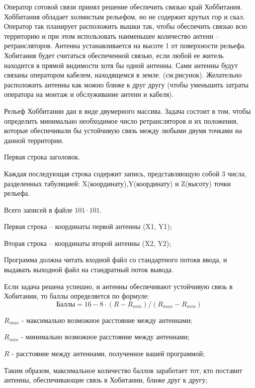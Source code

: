 
Оператор сотовой связи принял решение обеспечить связью край Хоббитания. Хоббитания обладает холмистым рельефом, но не содержит крутых гор и скал. Оператор так планирует расположить вышки так, чтобы обеспечить связью всю территорию и при этом использовать наименьшее количество антенн – ретрансляторов. 
Антенна устанавливается на высоте 1 от поверхности рельефа. Хобитания будет считаться обеспеченной связью, если любой ее житель находится в прямой видимости хотя бы одной антенны. Сами антенны будут связаны оператором кабелем, находящемся в земле. (см.рисунок). Желательно расположить антенны как можно ближе к друг другу (чтобы уменьшить затраты оператора на монтаж и обслуживание антенн и кабеля).


Рельеф Хоббитании дан в виде двумерного массива. Задача состоит в том, чтобы определить минимально необходимое число ретрансляторов и их положения, которые обеспечивали бы устойчивую связь между любыми двумя точками на данной территории.


Первая строка заголовок.

Каждая последующая строка содержит запись, представляющую собой 3 числа, разделенных табуляцией:
X(координату),Y(координату) и Z(высоту) точки рельефа.

Всего записей в файле $101 \cdot 101$.

\outputfmtSection

Первая строка – координаты первой антенны (X1, Y1);

Вторая строка – координаты второй антенны (X2, Y2);

Программа должна читать входной файл со стандартного потокв ввода, и выдавать выходной файл на стандратный поток вывода.

\markSection

Если задача решена успешно, и антенны обеспечивают устойчивую связь в Хобитании, то баллы определяется по формуле:
$$\text{Баллы}=16-8 \cdot (R-R_{min})/(R_{max}-R_{min})$$

$R_{max}$ - максимально возможное расстояние между антеннами;

$R_{min}$ - минимально возможное расстояние между антеннами;

$R$ - расстояние между антеннами, полученное вашей программой;

Таким образом, максимальное количество баллов заработает тот, кто поставит антенны, обеспечивающие связь в Хобитании, ближе друг к другу;

